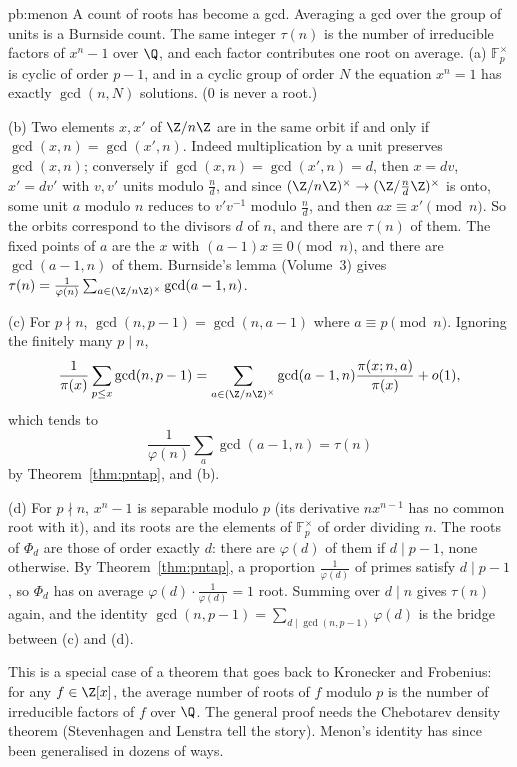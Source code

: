 \begin{solution}{pb:menon}
\idea A count of roots has become a gcd. Averaging a gcd over the group of units is a Burnside count. The same integer $\tau(n)$ is the number of irreducible factors of $x^n-1$ over $\Q$, and each factor contributes one root on average.
\writeup (a) $\mathbb F_p^\times$ is cyclic of order $p-1$, and in a cyclic group of order $N$ the equation $x^n=1$ has exactly $\gcd(n,N)$ solutions. ($0$ is never a root.)

(b) Two elements $x,x'$ of $\Z/n\Z$ are in the same orbit if and only if $\gcd(x,n)=\gcd(x',n)$. Indeed multiplication by a unit preserves $\gcd(x,n)$; conversely if
$\gcd(x,n)=\gcd(x',n)=d$, then $x=dv$, $x'=dv'$ with $v,v'$ units modulo $\frac nd$, and since $(\Z/n\Z)^\times\to(\Z/\frac nd\Z)^\times$ is onto, some unit $a$ modulo $n$
reduces to $v'v^{-1}$ modulo $\frac nd$, and then $ax\equiv x'\pmod n$. So the orbits correspond to the divisors $d$ of $n$, and there are $\tau(n)$ of them. The fixed points of $a$
are the $x$ with $(a-1)x\equiv0\pmod n$, and there are $\gcd(a-1,n)$ of them. Burnside's lemma (Volume~3) gives
$\tau(n)=\frac1{\varphi(n)}\sum_{a\in(\Z/n\Z)^\times}\gcd(a-1,n)$.

(c) For $p\nmid n$, $\gcd(n,p-1)=\gcd(n,a-1)$ where $a\equiv p\pmod n$. Ignoring the finitely many $p\mid n$,
\[
\frac1{\pi(x)}\sum_{p\le x}\gcd(n,p-1)=\sum_{a\in(\Z/n\Z)^\times}\gcd(a-1,n)\frac{\pi(x;n,a)}{\pi(x)}+o(1),
\]
which tends to
\[
\frac1{\varphi(n)}\sum_a\gcd(a-1,n)=\tau(n)
\]
by Theorem~\ref{thm:pntap}, and (b).

(d) For $p\nmid n$, $x^n-1$ is separable modulo $p$ (its derivative $nx^{n-1}$ has no common root with it), and its roots are the elements of $\mathbb F_p^\times$ of order dividing $n$.
The roots of $\Phi_d$ are those of order exactly $d$: there are $\varphi(d)$ of them if $d\mid p-1$, none otherwise. By Theorem~\ref{thm:pntap}, a proportion $\frac1{\varphi(d)}$ of primes satisfy
$d\mid p-1$, so $\Phi_d$ has on average $\varphi(d)\cdot\frac1{\varphi(d)}=1$ root. Summing over $d\mid n$ gives $\tau(n)$ again, and the identity
$\gcd(n,p-1)=\sum_{d\mid\gcd(n,p-1)}\varphi(d)$ is the bridge between (c) and (d).

\leads This is a special case of a theorem that goes back to Kronecker and Frobenius: for any $f\in\Z[x]$, the average number of roots of $f$ modulo $p$ is the number of irreducible factors of
$f$ over $\Q$. The general proof needs the Chebotarev density theorem (Stevenhagen and Lenstra tell the story). Menon's identity has since been generalised in dozens of ways.
\end{solution}


